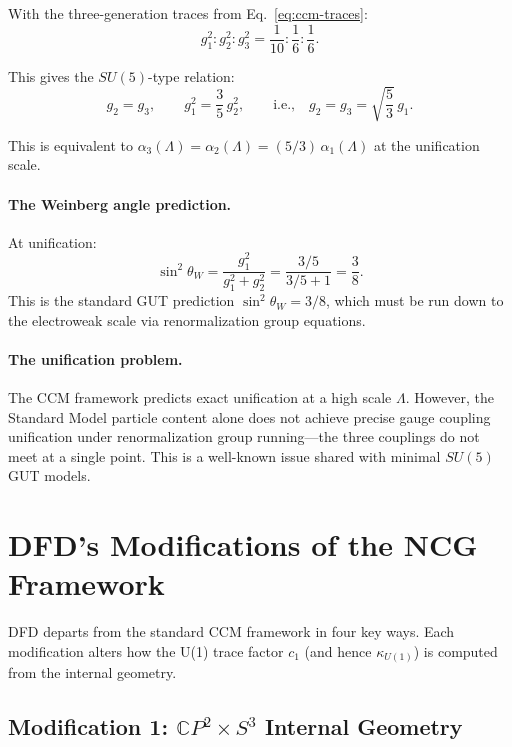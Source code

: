\documentclass[12pt,a4paper]{article}
\begin{document}
With the three-generation traces from Eq.~\eqref{eq:ccm-traces}:
\begin{equation}
g_1^2 : g_2^2 : g_3^2 = \frac{1}{10} : \frac{1}{6} : \frac{1}{6}.
\end{equation}

This gives the $SU(5)$-type relation:
\begin{equation}\label{eq:su5-relation}
\boxed{g_2 = g_3, \qquad g_1^2 = \frac{3}{5}\,g_2^2,
\qquad\text{i.e.,}\quad g_2 = g_3 = \sqrt{\frac{5}{3}}\,g_1.}
\end{equation}

This is equivalent to $\alpha_3(\Lambda) = \alpha_2(\Lambda)
= (5/3)\,\alpha_1(\Lambda)$ at the unification scale.

\paragraph{The Weinberg angle prediction.}
At unification:
\begin{equation}
\sin^2\theta_W = \frac{g_1^2}{g_1^2 + g_2^2}
= \frac{3/5}{3/5 + 1} = \frac{3}{8}.
\end{equation}
This is the standard GUT prediction $\sin^2\theta_W = 3/8$, which must be
run down to the electroweak scale via renormalization group equations.

\paragraph{The unification problem.}
The CCM framework predicts exact unification at a high scale $\Lambda$.
However, the Standard Model particle content alone does not achieve precise
gauge coupling unification under renormalization group running---the three
couplings do not meet at a single point.  This is a well-known issue shared
with minimal $SU(5)$ GUT models.

\section{DFD's Modifications of the NCG Framework}
\label{sec:dfd-mods}

DFD departs from the standard CCM framework in four key ways.
Each modification alters how the U(1) trace factor $c_1$ (and hence
$\kappa_{U(1)}$) is computed from the internal geometry.

\subsection{Modification 1: $\mathbb{C}P^2 \times S^3$ Internal Geometry}
\label{sec:mod-geometry}
\end{document}
